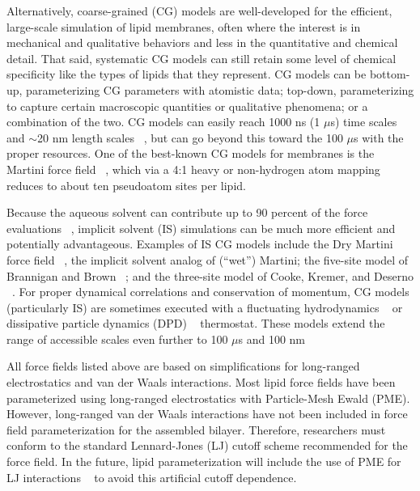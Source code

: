 \documentclass[9pt,bestpractices,pubversion]{livecoms}
\begin{document}
Alternatively, coarse-grained (CG) models are well-developed for the efficient, large-scale simulation of lipid membranes, often where the interest is in mechanical and qualitative behaviors and less in the quantitative and chemical detail.
That said, systematic CG models can still retain some level of chemical specificity like the types of lipids that they represent.
CG models can be bottom-up, parameterizing CG parameters with atomistic data; top-down, parameterizing to capture certain macroscopic quantities or qualitative phenomena; or a combination of the two.
CG models can easily reach 1000 ns (1 $\mu$s) time scales and $\sim$20 nm length scales  ~\cite{Smirnova2015}, but can go beyond this toward the 100 $\mu$s with the proper resources.
One of the best-known CG models for membranes is the Martini force field  ~\cite{Marrink2004,Marrink2007a}, which via a 4:1 heavy or non-hydrogen atom mapping reduces to about ten pseudoatom sites per lipid.

Because the aqueous solvent can contribute up to 90 percent of the force evaluations ~\cite{Arnarez2015}, implicit solvent (IS) simulations can be much more efficient and potentially advantageous.
Examples of IS CG models include the Dry Martini force field ~\cite{Arnarez2015}, the implicit solvent analog of (``wet'') Martini; the five-site model of Brannigan and Brown ~\cite{Brannigan2005b}; and the three-site model of Cooke, Kremer, and Deserno ~\cite{Cooke2005a}.
For proper dynamical correlations and conservation of momentum, CG models (particularly IS) are sometimes executed with a fluctuating hydrodynamics ~\cite{Zgorski2016,Wang2013} or dissipative particle dynamics (DPD) ~\cite{Deserno2009} thermostat.
These models extend the range of accessible scales even further to 100 $\mu$s and 100 nm  ~\cite{Smirnova2015}

All force fields listed above are based on simplifications for long-ranged electrostatics and van der Waals interactions.
Most lipid force fields have been parameterized using long-ranged electrostatics with Particle-Mesh Ewald (PME).
However, long-ranged van der Waals interactions have not been included in force field parameterization for the assembled bilayer.
Therefore, researchers must conform to the standard Lennard-Jones (LJ) cutoff scheme recommended for the force field.
In the future, lipid parameterization will include the use of PME for LJ interactions ~\cite{Leonard2018} to avoid this artificial cutoff dependence.
\end{document}
